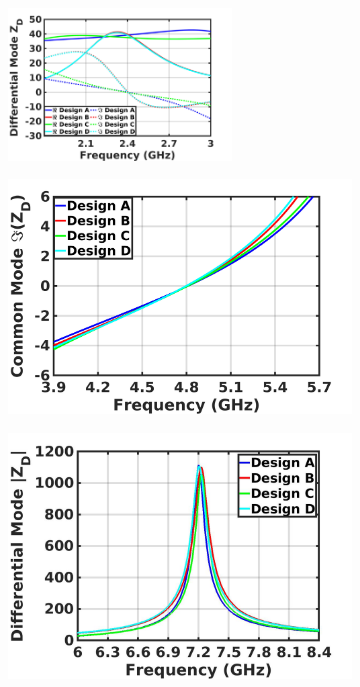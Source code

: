 \documentclass[conference]{IEEEtran}
\begin{document}
\begin{figure}[!t]
\captionsetup{font=footnotesize}
\centering
\begin{subfigure}{0.5\textwidth}
\centering
\includegraphics[width=0.65\textwidth]{Images/Output_Network_Comp/Comp_1H.jpg}
\caption{}
\label{fig:Comp_1H}
\end{subfigure}
\begin{subfigure}{0.24\textwidth}
\includegraphics[width=1\textwidth]{Images/Output_Network_Comp/Comp_2H_imag.jpg}
\caption{}
\label{fig:Comp_2H_imag}
\end{subfigure}
\begin{subfigure}{0.24\textwidth}
\includegraphics[width=1\textwidth]{Images/Output_Network_Comp/Comp_3H_Mag.jpg}

\end{subfigure}
\end{figure}
\end{document}
